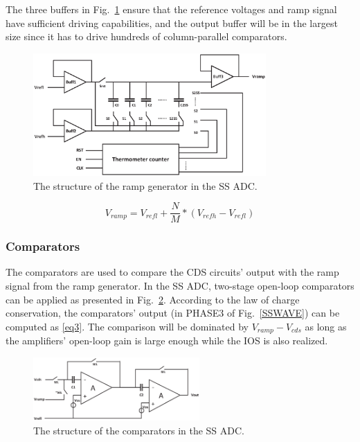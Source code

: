 The three buffers in Fig.~\ref{RAMP} ensure that the reference voltages and ramp signal have sufficient driving capabilities, 
and the output buffer will be in the largest size since it has to drive hundreds of column-parallel comparators.

\begin{figure}[htbp]
	\centerline{\includegraphics[width=3.5in]{./Figures/RAMP.eps}}
	\caption{The structure of the ramp generator in the SS ADC.}
	\label{RAMP}
\end{figure} 

\begin{equation}
	V_{ramp}=V_{refl}+\frac{N}{M}\ast\left(V_{refh}-V_{refl}\right)
	\label{eq2}
\end{equation}

\subsubsection{Comparators}

The comparators are used to compare the CDS circuits' output with the ramp signal from the ramp generator. 
In the SS ADC, two-stage open-loop comparators can be applied as presented in Fig.~\ref{COM}. According to the law of charge conservation, 
the comparators’ output (in PHASE3 of Fig.~\ref{SSWAVE}) can be computed as \eqref{eq3}. The comparison will be dominated by $V_{ramp}-V_{cds}$ as long as the amplifiers’ open-loop gain 
is large enough while the IOS is also realized.%

\begin{figure}[htbp]
	\centerline{\includegraphics[width=2.5in]{./Figures/COM.eps}}
	\caption{The structure of the comparators in the SS ADC.}
	\label{COM}
\end{figure} 

